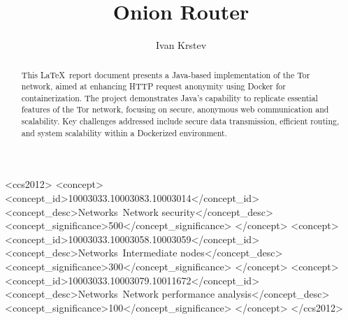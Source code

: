 \documentclass[sigconf]{acmart}
\begin{document}
\title{Onion Router}

\author{Ivan Krstev}



\begin{abstract}
    This \LaTeX\ report document presents a Java-based implementation of the Tor network, aimed at enhancing HTTP request anonymity using Docker for containerization. The project demonstrates Java's capability to replicate essential features of the Tor network, focusing on secure, anonymous web communication and scalability. Key challenges addressed include secure data transmission, efficient routing, and system scalability within a Dockerized environment.
\end{abstract}

\begin{CCSXML}
<ccs2012>
   <concept>
       <concept_id>10003033.10003083.10003014</concept_id>
       <concept_desc>Networks~Network security</concept_desc>
       <concept_significance>500</concept_significance>
       </concept>
   <concept>
       <concept_id>10003033.10003058.10003059</concept_id>
       <concept_desc>Networks~Intermediate nodes</concept_desc>
       <concept_significance>300</concept_significance>
       </concept>
   <concept>
       <concept_id>10003033.10003079.10011672</concept_id>
       <concept_desc>Networks~Network performance analysis</concept_desc>
       <concept_significance>100</concept_significance>
       </concept>
 </ccs2012>
\end{CCSXML}
\end{document}
